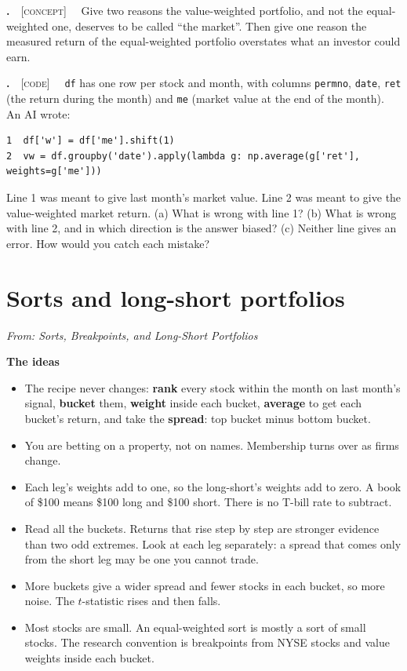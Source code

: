 \documentclass[11pt]{article}
\newcounter{ex}[section]
\renewcommand{\theex}{\thesection.\arabic{ex}}
\newenvironment{ex}[1][calculation]{\refstepcounter{ex}\par\medskip\textbf{\theex}\ \ {\small\textsc{[#1]}}\ \ }{\par}
\newcommand{\head}[1]{\par\medskip\textbf{#1}\par}
\begin{document}
\begin{ex}[concept]\label{ex:1.5}
Give two reasons the value-weighted portfolio, and not the equal-weighted one, deserves to be called ``the market''.
Then give one reason the measured return of the equal-weighted portfolio overstates what an investor could earn.
\end{ex}

\begin{ex}[code]\label{ex:1.6}
\texttt{df} has one row per stock and month, with columns \texttt{permno}, \texttt{date}, \texttt{ret} (the return during
the month) and \texttt{me} (market value at the end of the month). An AI wrote:
\begin{verbatim}
1  df['w'] = df['me'].shift(1)
2  vw = df.groupby('date').apply(lambda g: np.average(g['ret'], weights=g['me']))
\end{verbatim}
Line 1 was meant to give last month's market value. Line 2 was meant to give the value-weighted market return.
(a) What is wrong with line 1? (b) What is wrong with line 2, and in which direction is the answer biased? (c) Neither
line gives an error. How would you catch each mistake?
\end{ex}

\section{Sorts and long-short portfolios}
{\small\emph{From: Sorts, Breakpoints, and Long-Short Portfolios}}

\head{The ideas}
\begin{itemize}
\item The recipe never changes: \textbf{rank} every stock within the month on last month's signal, \textbf{bucket}
them, \textbf{weight} inside each bucket, \textbf{average} to get each bucket's return, and take the \textbf{spread}:
top bucket minus bottom bucket.
\item You are betting on a property, not on names. Membership turns over as firms change.
\item Each leg's weights add to one, so the long-short's weights add to zero. A book of \$100 means \$100 long and \$100
short. There is no T-bill rate to subtract.
\item Read all the buckets. Returns that rise step by step are stronger evidence than two odd extremes. Look at each
leg separately: a spread that comes only from the short leg may be one you cannot trade.
\item More buckets give a wider spread and fewer stocks in each bucket, so more noise. The $t$-statistic rises and then
falls.
\item Most stocks are small. An equal-weighted sort is mostly a sort of small stocks. The research convention is
breakpoints from NYSE stocks and value weights inside each bucket.
\end{itemize}
\end{document}
